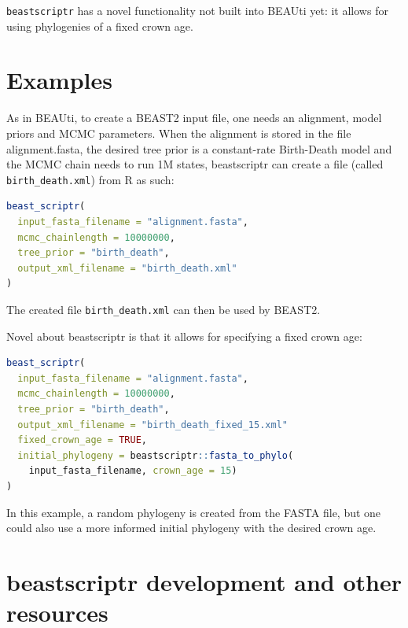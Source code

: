 \documentclass{article}
\begin{document}
\verb;beastscriptr; has a novel functionality not built into BEAUti yet:
it allows for using phylogenies of a fixed crown age. 


\section{Examples}


As in BEAUti, to create a BEAST2 input file, 
one needs an alignment, model priors and MCMC parameters.
When the alignment is stored in the file alignment.fasta,
the desired tree prior is a constant-rate Birth-Death 
model \cite{nee1994reconstructed} and the MCMC chain needs to run 1M 
states, beastscriptr can create a file 
(called \verb;birth_death.xml;) from R 
as such:

\begin{lstlisting}[language=R]
beast_scriptr(
  input_fasta_filename = "alignment.fasta",
  mcmc_chainlength = 10000000,
  tree_prior = "birth_death",
  output_xml_filename = "birth_death.xml"
)
\end{lstlisting}

The created file \verb;birth_death.xml; can then be used by BEAST2.

Novel about beastscriptr is that it allows for specifying a fixed crown age:

\begin{lstlisting}[language=R]
beast_scriptr(
  input_fasta_filename = "alignment.fasta",
  mcmc_chainlength = 10000000,
  tree_prior = "birth_death",
  output_xml_filename = "birth_death_fixed_15.xml"
  fixed_crown_age = TRUE,
  initial_phylogeny = beastscriptr::fasta_to_phylo(
    input_fasta_filename, crown_age = 15)
)
\end{lstlisting}

In this example, a random phylogeny is created from the FASTA file, but
one could also use a more informed initial phylogeny with the desired crown age. 

\section{beastscriptr development and other resources}
\end{document}
